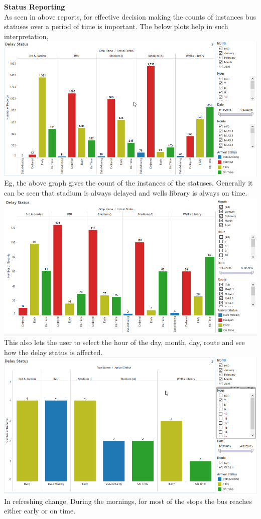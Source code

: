 \documentclass[12pt]{article}
\begin{document}
\textbf{Status Reporting} \\
As seen in above reports, for effective decision making the counts of instances bus statuses over a period of time is important. The below plots help in such interpretation,
\includegraphics[scale=0.55]{resources/tableau1}\\[1cm] 
Eg, the above graph gives the count of the instances of the statuses. Generally it can be seen that stadium is always delayed and wells library is always on time.\\
\includegraphics[scale=0.55]{resources/tableau2}\\[1cm] 
This also lets the user to select the hour of the day, month, day, route and see how the delay status is affected.\\
\includegraphics[scale=0.55]{resources/tableau3}\\[1cm] 
In refreshing change, During the mornings, for most of the stops the bus reaches either early or on time.
\end{document}
